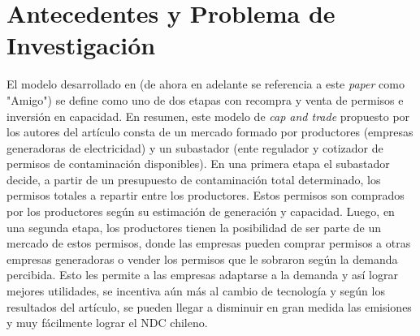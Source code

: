 \section{Antecedentes y Problema de Investigación}

El modelo desarrollado en \cite{amigo_two_2021} (de ahora en adelante se referencia a este \textit{paper} como "Amigo") se define como uno de dos etapas con recompra y venta de permisos e inversión en capacidad. En resumen, este modelo de \textit{cap and trade} propuesto por los autores del artículo consta de un mercado formado por productores (empresas generadoras de electricidad) y un subastador (ente regulador y cotizador de permisos de contaminación disponibles). En una primera etapa el subastador decide, a partir de un presupuesto de contaminación total determinado, los permisos totales a repartir entre los productores. Estos permisos son comprados por los productores según su estimación de generación y capacidad. Luego, en una segunda etapa, los productores tienen la posibilidad de ser parte de un mercado de estos permisos, donde las empresas pueden comprar permisos a otras empresas generadoras o vender los permisos que le sobraron según la demanda percibida. Esto les permite a las empresas adaptarse a la demanda y así lograr mejores utilidades, se incentiva aún más al cambio de tecnología y según los resultados del artículo, se pueden llegar a disminuir en gran medida las emisiones y muy fácilmente lograr el NDC chileno. 
\vspace{2.5mm}

